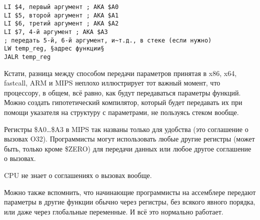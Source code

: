 \begin{lstlisting}[caption=MIPS (соглашение о вызовах O32)]
LI $4, первый аргумент ; AKA $A0
LI $5, второй аргумент ; AKA $A1
LI $6, третий аргумент ; AKA $A2
LI $7, 4-й аргумент ; AKA $A3
; передать 5-й, 6-й аргумент, и~т.д., в стеке (если нужно)
LW temp_reg, §адрес функции§
JALR temp_reg
\end{lstlisting}


Кстати, разница между способом передачи параметров принятая в x86, x64, fastcall, ARM и MIPS неплохо иллюстрирует тот важный момент, что процессору, в общем, всё равно, как будут 
передаваться параметры функций. Можно создать гипотетический компилятор, который будет передавать их при 
помощи указателя на структуру с параметрами, не пользуясь стеком вообще.

Регистры \$A0\dots \$A3 в MIPS так названы только для удобства (это соглашение о вызовах O32).
Программисты могут использовать любые другие регистры (может быть, только кроме \$ZERO) для
передачи данных или любое другое соглашение о вызовах.

\ac{CPU} не знает о соглашениях о вызовах вообще.

Можно также вспомнить, что начинающие программисты на ассемблере передают параметры 
в другие функции обычно через регистры, без всякого явного порядка, или даже через глобальные переменные.
И всё это нормально работает.

